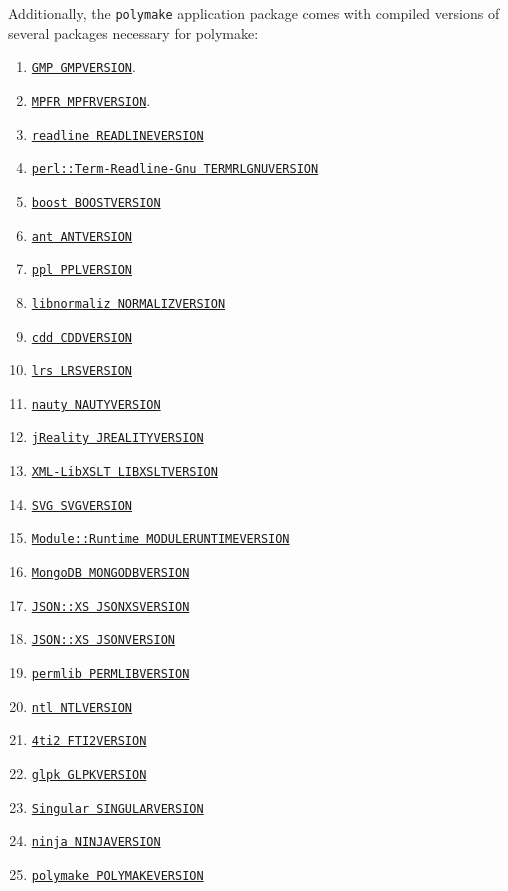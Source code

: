 \documentclass[a4paper]{amsart}
\newcommand{\polymake}{\texttt{polymake}\xspace}
\begin{document}
Additionally, the \polymake application package comes with compiled versions of several packages necessary for polymake: 
\begin{enumerate}
\item \href{GMPHOME}{\texttt{GMP GMPVERSION}}.
\item \href{MPFRHOME}{\texttt{MPFR MPFRVERSION}}.
\item \href{READLINEHOME}{\texttt{readline READLINEVERSION}}
\item \href{TERMRLGNUHOME}{\texttt{perl::Term-Readline-Gnu TERMRLGNUVERSION}}
\item \href{BOOSTHOME}{\texttt{boost BOOSTVERSION}}
\item \href{ANTHOME}{\texttt{ant ANTVERSION}}
\item \href{PPLHOME}{\texttt{ppl PPLVERSION}}
\item \href{NORMALIZHOME}{\texttt{libnormaliz NORMALIZVERSION}}
\item \href{CDDHOME}{\texttt{cdd CDDVERSION}}
\item \href{LRSHOME}{\texttt{lrs LRSVERSION}}
\item \href{NAUTYHOME}{\texttt{nauty NAUTYVERSION}}
\item \href{JREALITYHOME}{\texttt{jReality JREALITYVERSION}}
\item \href{LIBXSLTHOME}{\texttt{XML-LibXSLT LIBXSLTVERSION}}
\item \href{SVGHOME}{\texttt{SVG SVGVERSION}}
\item \href{MODULERUNTIMEHOME}{\texttt{Module::Runtime MODULERUNTIMEVERSION}}
\item \href{MONGODBHOME}{\texttt{MongoDB MONGODBVERSION}}
\item \href{JSONXSHOME}{\texttt{JSON::XS JSONXSVERSION}}
\item \href{JSONHOME}{\texttt{JSON::XS JSONVERSION}}
\item \href{PERMLIBHOME}{\texttt{permlib PERMLIBVERSION}}
\item \href{NTLHOME}{\texttt{ntl NTLVERSION}}
\item \href{FTI2HOME}{\texttt{4ti2 FTI2VERSION}}
\item \href{GLPKHOME}{\texttt{glpk GLPKVERSION}}
\item \href{SINGULARHOME}{\texttt{Singular SINGULARVERSION}}
\item \href{NINJAHOME}{\texttt{ninja NINJAVERSION}}
\item \href{POLYMAKEHOME}{\texttt{polymake POLYMAKEVERSION}}
\end{enumerate}
\end{document}
